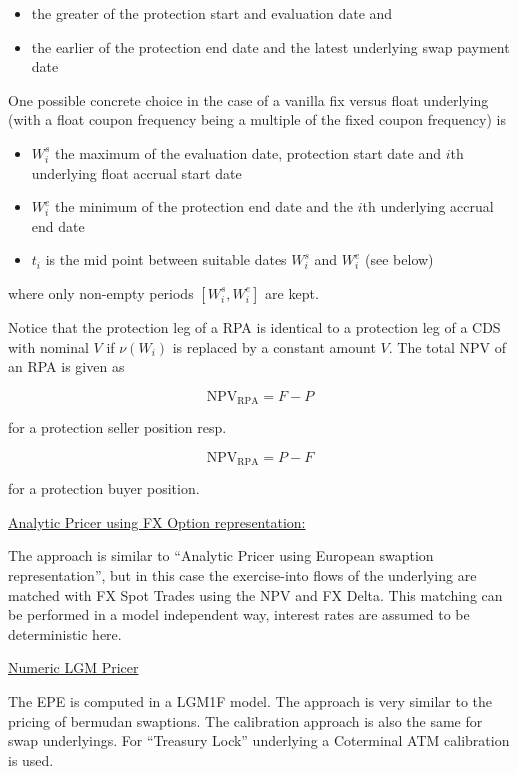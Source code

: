 \begin{itemize}
\item the greater of the protection start and evaluation date and
\item the earlier of the protection end date and the latest underlying swap payment date
\end{itemize}

One possible concrete choice in the case of a vanilla fix versus float underlying (with a float
coupon frequency being a multiple of the fixed coupon frequency) is

\begin{itemize}
\item $W^s_i$ the maximum of the evaluation date, protection start date and $i$th underlying float accrual start date
\item $W^e_i$ the minimum of the protection end date and the $i$th underlying accrual end date
\item $t_i$ is the mid point between suitable dates $W^s_i$ and $W^e_i$ (see below)
\end{itemize}

where only non-empty periods $[W^s_i, W^e_i]$ are kept.

Notice that the protection leg of a RPA is identical to a protection leg of a CDS with nominal $V$ if $\nu(W_i)$ is
replaced by a constant amount $V$. The total NPV of an RPA is given as

\begin{equation}
\text{NPV}_{\text{RPA}} = F - P
\end{equation}

for a protection seller position resp.

\begin{equation}
\text{NPV}_{\text{RPA}} = P - F
\end{equation}

for a protection buyer position.

\underline{Analytic Pricer using FX Option representation:}

The approach is similar to ``Analytic Pricer using European swaption representation'', but in this case the
exercise-into flows of the underlying are matched with FX Spot Trades using the NPV and FX Delta. This matching can be
performed in a model independent way, interest rates are assumed to be deterministic here.

\underline{Numeric LGM Pricer}

The EPE is computed in a LGM1F model. The approach is very similar to the pricing of bermudan swaptions. The calibration
approach is also the same for swap underlyings. For ``Treasury Lock'' underlying a Coterminal ATM calibration is used.
